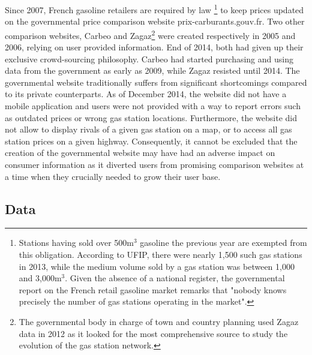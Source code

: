 \documentclass[english]{article}
\begin{document}
Since 2007, French gasoline retailers are required by law%
\footnote{Stations having sold over 500m$^{3}$ gasoline the previous year are exempted from this obligation. According to UFIP, there were nearly 1,500 such gas stations in 2013, while the medium volume sold by a gas station was between 1,000 and 3,000m$^{3}$. Given the absence of a national register, the governmental report \cite{BEL12} on the French retail gasoline market remarks that "nobody knows precisely the number of gas stations operating in the market".}%
to keep prices updated on the governmental price comparison website prix-carburants.gouv.fr. Two other comparison websites, Carbeo and Zagaz\footnote{The governmental body in charge of town and country planning used Zagaz data in 2012 as it looked for the most comprehensive source to study the evolution of the gas station network.} were created respectively in 2005 and 2006, relying on user provided information. End of 2014, both had given up their exclusive crowd-sourcing philosophy. Carbeo had started purchasing and using data from the government as early as 2009, while Zagaz resisted until 2014. The governmental website traditionally suffers from significant shortcomings compared to its private counterparts. As of December 2014, the website did not have a mobile application and users were not provided with a way to report errors such as outdated prices or wrong gas station locations. Furthermore, the website did not allow to display rivals of a given gas station on a map, or to access all gas station prices on a given highway. Consequently, it cannot be excluded that the creation of the governmental website may have had an adverse impact on consumer information as it diverted users from promising comparison websites at a time when they crucially needed to grow their user base.


\subsection{Data}
\end{document}
